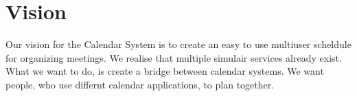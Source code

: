 \section{Vision}
Our vision for the Calendar System is to create an easy to use multiuser
scheldule for organizing meetings. We realise that multiple simulair services
already exist. What we want to do, is create a bridge between calendar systems. We want people, who use differnt calendar applications, to plan together.
\newpage
